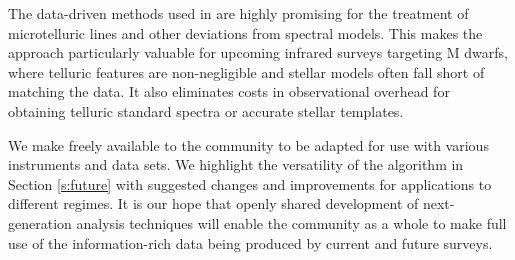 \documentclass[modern]{aastex62}
\begin{document}
The data-driven methods used in \wobble are highly promising for the treatment of microtelluric lines and other deviations from spectral models. 
This makes the approach particularly valuable for upcoming infrared surveys targeting M dwarfs, where telluric features are non-negligible and stellar models often fall short of matching the data. 
It also eliminates costs in observational overhead for obtaining telluric standard spectra or accurate stellar templates.

We make \wobble freely available to the \RV community to be adapted for use with various instruments and data sets. 
We highlight the versatility of the algorithm in Section \ref{s:future} with suggested changes and improvements for applications to different regimes. 
It is our hope that openly shared development of next-generation \RV analysis techniques will enable the community as a whole to make full use of the information-rich data being produced by current and future \EPRV surveys.




\end{document}
